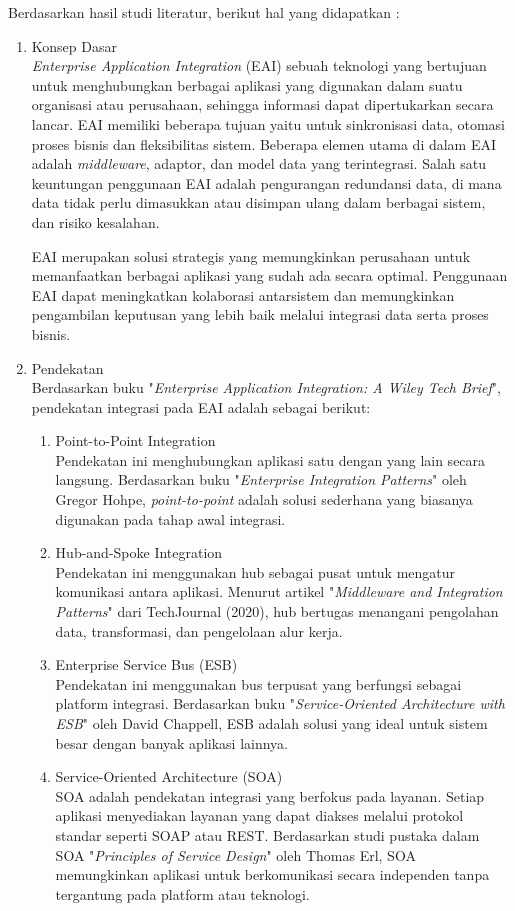 Berdasarkan hasil studi literatur, berikut hal yang didapatkan :
\begin{enumerate}[label*=\arabic*.,ref=\arabic*]
    \item Konsep Dasar \\
    \textit{Enterprise Application Integration} (EAI) sebuah teknologi yang bertujuan untuk menghubungkan berbagai aplikasi yang digunakan dalam suatu organisasi atau perusahaan, sehingga informasi dapat dipertukarkan secara lancar. EAI memiliki beberapa tujuan yaitu untuk sinkronisasi data, otomasi proses bisnis dan fleksibilitas sistem. Beberapa elemen utama di dalam EAI adalah \textit{middleware}, adaptor, dan model data yang terintegrasi. Salah satu keuntungan penggunaan EAI adalah pengurangan redundansi data, di mana data tidak perlu dimasukkan atau disimpan ulang dalam berbagai sistem, dan risiko kesalahan. 

    EAI merupakan solusi strategis yang memungkinkan perusahaan untuk memanfaatkan berbagai aplikasi yang sudah ada secara optimal. Penggunaan EAI dapat meningkatkan kolaborasi antarsistem dan memungkinkan pengambilan keputusan yang lebih baik melalui integrasi data serta proses bisnis. 

    \item Pendekatan \\
    Berdasarkan buku "\textit{Enterprise Application Integration: A Wiley Tech Brief}", pendekatan integrasi pada EAI adalah sebagai berikut:
    \begin{enumerate}[label=\alph*.]
        \item Point-to-Point Integration \\
        Pendekatan ini menghubungkan aplikasi satu dengan yang lain secara langsung. Berdasarkan buku "\textit{Enterprise Integration Patterns}" oleh Gregor Hohpe, \textit{point-to-point} adalah solusi sederhana yang biasanya digunakan pada tahap awal integrasi.
        \item Hub-and-Spoke Integration \\
        Pendekatan ini menggunakan hub sebagai pusat untuk mengatur komunikasi antara aplikasi. Menurut artikel "\textit{Middleware and Integration Patterns}" dari TechJournal (2020), hub bertugas menangani pengolahan data, transformasi, dan pengelolaan alur kerja.
        \item Enterprise Service Bus (ESB) \\
        Pendekatan ini menggunakan bus terpusat yang berfungsi sebagai platform integrasi. Berdasarkan buku "\textit{Service-Oriented Architecture with ESB}" oleh David Chappell, ESB adalah solusi yang ideal untuk sistem besar dengan banyak aplikasi lainnya.
        \item Service-Oriented Architecture (SOA)\\ 
        SOA adalah pendekatan integrasi yang berfokus pada layanan. Setiap aplikasi menyediakan layanan yang dapat diakses melalui protokol standar seperti SOAP atau REST. Berdasarkan studi pustaka dalam SOA "\textit{Principles of Service Design}" oleh Thomas Erl, SOA memungkinkan aplikasi untuk berkomunikasi secara independen tanpa tergantung pada platform atau teknologi.
    \end{enumerate}


\end{enumerate}
